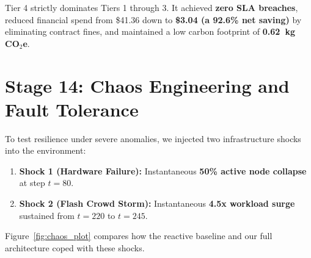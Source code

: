 \documentclass[12pt]{report}
\begin{document}
\begin{table}[htbp]
\centering
\caption{Multi-Objective Benchmarking Across Architectural Tiers (2,500 Unseen Steps)}
\label{tab:pareto_metrics}
\end{table}

Tier 4 strictly dominates Tiers 1 through 3. It achieved \textbf{zero SLA breaches}, reduced financial spend from \$41.36 down to \textbf{\$3.04 (a 92.6\% net saving)} by eliminating contract fines, and maintained a low carbon footprint of \textbf{0.62~kg CO$_2$e}.

\section{Stage 14: Chaos Engineering and Fault Tolerance}

To test resilience under severe anomalies, we injected two infrastructure shocks into the environment:
\begin{enumerate}
\item \textbf{Shock 1 (Hardware Failure):} Instantaneous \textbf{50\% active node collapse} at step $t=80$.
\item \textbf{Shock 2 (Flash Crowd Storm):} Instantaneous \textbf{4.5x workload surge} sustained from $t=220$ to $t=245$.
\end{enumerate}

Figure~\ref{fig:chaos_plot} compares how the reactive baseline and our full architecture coped with these shocks.
\end{document}
